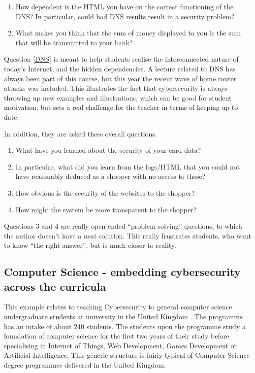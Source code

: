 \documentclass[conference]{IEEEtran}
\begin{document}
\begin{itemize}
\begin{enumerate}
\item How dependent is the HTML you have on the correct functioning of the DNS? In particular, could bad DNS results result in a security problem?\label{DNS}
\item What makes you think that the sum of money displayed to you is the sum that will be transmitted to your bank?
\end{enumerate}
Question \ref{DNS} is meant to help students realise the interconnected nature of today's Internet, and the hidden dependencies. A lecture related to DNS has always been part of this course, but this year the recent wave of home router attacks  \cite[and others]{Balaji2020a} was included. This illustrates the fact that cybersecurity is always throwing up new examples and illustrations, which can be good for student motivation, but sets a real challenge for the teacher in terms of keeping up to date.
\par
In addition, they are asked these overall questions.
\begin{enumerate}
\item What have you learned about the security of your card data?
\item In particular, what did you learn from the logs/HTML that you could not have reasonably deduced as a shopper with no access to these?
\item How obvious is the security of the websites to the shopper?
\item How might the system be more transparent to the shopper?
\end{enumerate}
Questions 3 and 4 are really open-ended ``problem-solving'' questions, to which the author doesn't have a neat solution. This really frustrates students, who want to know ``the right answer'', but is much closer to reality.
\end{itemize}

\subsection{Computer Science - embedding cybersecurity across the curricula}\label{sec:fifth} %

This example relates to teaching Cybersecurity to general computer science undergraduate students at university in the United Kingdom . The programme has an intake of about 240 students. The students upon the programme study a foundation of computer science for the first two years of their study before specialising in Internet of Things, Web Development, Games Development or Artificial Intelligence. This generic structure is fairly typical of Computer Science degree programmes delivered in the United Kingdom.
\end{document}
